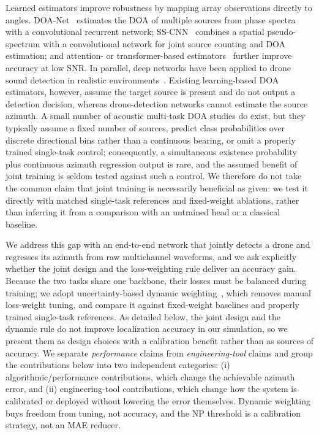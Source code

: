 \documentclass[sensors,article,submit,pdftex,moreauthors]{Definitions/mdpi}
\begin{document}
Learned estimators improve robustness by mapping array observations directly to angles. DOA-Net~\cite{adavanne2018doa} estimates the DOA of multiple sources from phase spectra with a convolutional recurrent network; SS-CNN~\cite{nguyen2020sscnn} combines a spatial pseudo-spectrum with a convolutional network for joint source counting and DOA estimation; and attention- or transformer-based estimators~\cite{vaswani2017attention,wang2024transformer,mack2022attention} further improve accuracy at low SNR. In parallel, deep networks have been applied to drone sound detection in realistic environments~\cite{jeon2017drone,kim2017uav}. Existing learning-based DOA estimators, however, assume the target source is present and do not output a detection decision, whereas drone-detection networks cannot estimate the source azimuth. A small number of acoustic multi-task DOA studies do exist, but they typically assume a fixed number of sources, predict class probabilities over discrete directional bins rather than a continuous bearing, or omit a properly trained single-task control; consequently, a simultaneous existence probability plus continuous azimuth regression output is rare, and the assumed benefit of joint training is seldom tested against such a control. We therefore do not take the common claim that joint training is necessarily beneficial as given: we test it directly with matched single-task references and fixed-weight ablations, rather than inferring it from a comparison with an untrained head or a classical baseline.

We address this gap with an end-to-end network that jointly detects a drone and regresses its azimuth from raw multichannel waveforms, and we ask explicitly whether the joint design and the loss-weighting rule deliver an accuracy gain. Because the two tasks share one backbone, their losses must be balanced during training; we adopt uncertainty-based dynamic weighting~\cite{kendall2018mtl}, which removes manual loss-weight tuning, and compare it against fixed-weight baselines and properly trained single-task references. As detailed below, the joint design and the dynamic rule do not improve localization accuracy in our simulation, so we present them as design choices with a calibration benefit rather than as sources of accuracy. We separate \emph{performance} claims from \emph{engineering-tool} claims and group the contributions below into two independent categories: (i) algorithmic/performance contributions, which change the achievable azimuth error, and (ii) engineering-tool contributions, which change how the system is calibrated or deployed without lowering the error themselves. Dynamic weighting buys freedom from tuning, not accuracy, and the NP threshold is a calibration strategy, not an MAE reducer.
\end{document}
